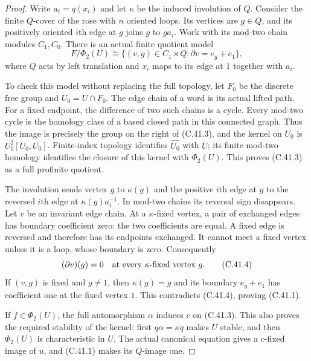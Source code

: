 \begin{proof}
Write $a_i=q(x_i)$ and let $\kappa$ be the induced involution of $Q$.
Consider the finite $Q$-cover of the rose with $n$ oriented loops.
Its vertices are $g\in Q$, and its positively oriented $i$th edge at
$g$ joins $g$ to $ga_i$. Work with its mod-two chain modules
$C_1,C_0$. There is an actual finite quotient model
\[
 F/\Phi_2(U)\cong
 \{(v,g)\in C_1\rtimes Q:\partial v=e_g+e_1\},                  \tag{C.41.3}
\]
where $Q$ acts by left translation and $x_i$ maps to its edge at $1$
together with $a_i$.

To check this model without replacing the full topology, let $F_0$
be the discrete free group and $U_0=U\cap F_0$. The edge chain of
a word is its actual lifted path. For a fixed endpoint, the difference
of two such chains is a cycle. Every mod-two cycle is the homology
class of a based closed path in this connected graph. Thus the image
is precisely the group on the right of (C.41.3), and the kernel on
$U_0$ is $U_0^2[U_0,U_0]$. Finite-index topology identifies
$\widehat{U_0}$ with $U$; its finite mod-two homology identifies the
closure of this kernel with $\Phi_2(U)$. This proves (C.41.3) as a
full profinite quotient.

The involution sends vertex $g$ to $\kappa(g)$ and the positive
$i$th edge at $g$ to the reversed $i$th edge at
$\kappa(g)a_i^{-1}$. In mod-two chains its reversal sign disappears.
Let $v$ be an invariant edge chain. At a $\kappa$-fixed vertex, a
pair of exchanged edges has boundary coefficient zero: the two
coefficients are equal. A fixed edge is reversed and therefore has
its endpoints exchanged. It cannot meet a fixed vertex unless it
is a loop, whose boundary is zero. Consequently
\[
 (\partial v)(g)=0\quad\hbox{at every $\kappa$-fixed vertex $g$}.
                                                                    \tag{C.41.4}
\]
If $(v,g)$ is fixed and $g\ne1$, then $\kappa(g)=g$ and its
boundary $e_g+e_1$ has coefficient one at the fixed vertex $1$.
This contradicts (C.41.4), proving (C.41.1).

If $f\in\Phi_2(U)$, the full automorphism $\alpha$ induces $c$
on (C.41.3). This also proves the required stability of the kernel:
first $q\alpha=\kappa q$ makes $U$ stable, and then $\Phi_2(U)$
is characteristic in $U$. The actual canonical equation gives a
$c$-fixed image of $u$, and (C.41.1) makes its $Q$-image one.
\end{proof}

